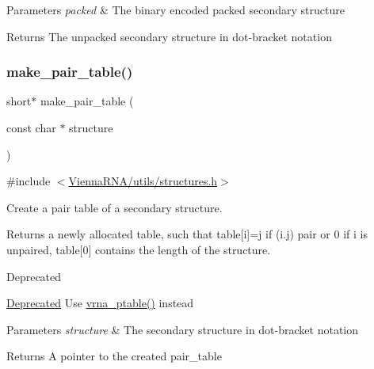 \begin{DoxyParams}{Parameters}
{\em packed} & The binary encoded packed secondary structure \\
\hline
\end{DoxyParams}
\begin{DoxyReturn}{Returns}
The unpacked secondary structure in dot-\/bracket notation 
\end{DoxyReturn}
\mbox{\label{group__struct__utils__deprecated_ga89c32307ee50a0026f4a3131fac0845a}} 
\subsubsection{\texorpdfstring{make\_pair\_table()}{make\_pair\_table()}}
{\footnotesize\ttfamily short$\ast$ make\+\_\+pair\+\_\+table (\begin{DoxyParamCaption}\item[{const char $\ast$}]{structure }\end{DoxyParamCaption})}



{\ttfamily \#include $<$\mbox{\hyperlink{utils_2structures_8h}{Vienna\+R\+N\+A/utils/structures.\+h}}$>$}



Create a pair table of a secondary structure. 

Returns a newly allocated table, such that table\mbox{[}i\mbox{]}=j if (i.\+j) pair or 0 if i is unpaired, table\mbox{[}0\mbox{]} contains the length of the structure.

\begin{DoxyRefDesc}{Deprecated}
\item[\mbox{\hyperlink{deprecated__deprecated000200}{Deprecated}}]Use \mbox{\hyperlink{group__struct__utils__pair__table_gae829fb8bb7f694c12a9c0bbc34c77c60}{vrna\+\_\+ptable()}} instead\end{DoxyRefDesc}

\begin{DoxyParams}{Parameters}
{\em structure} & The secondary structure in dot-\/bracket notation \\
\hline
\end{DoxyParams}
\begin{DoxyReturn}{Returns}
A pointer to the created pair\+\_\+table 
\end{DoxyReturn}
\mbox{\label{group__struct__utils__deprecated_gafeaa6d68eef3a99d0a7aa08aa91c6601}} 
